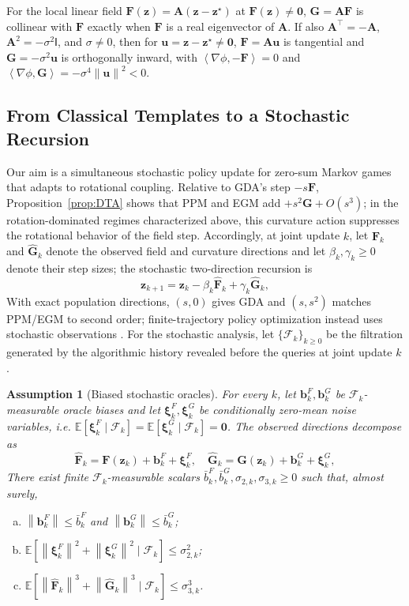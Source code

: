 \documentclass{article}
\newtheorem{assumption}{Assumption}
\theoremstyle{remark}
\newcommand{\E}{\mathbb{E}}
\newcommand{\inner}[2]{\left\langle #1,#2\right\rangle}
\newcommand{\norm}[1]{\left\lVert #1\right\rVert}
\newcommand{\Id}{\mathsf{I}}
\newcommand{\bz}{\boldsymbol{z}}
\newcommand{\bu}{\boldsymbol{u}}
\newcommand{\bzero}{\boldsymbol{0}}
\newcommand{\bA}{\boldsymbol{A}}
\newcommand{\bF}{\boldsymbol{F}}
\newcommand{\bG}{\boldsymbol{G}}
\newcommand{\hatF}{\widehat{\boldsymbol{F}}}
\newcommand{\hatG}{\widehat{\boldsymbol{G}}}
\newcommand{\biasF}{\boldsymbol{b}^{F}}
\newcommand{\biasG}{\boldsymbol{b}^{G}}
\newcommand{\noiseF}{\boldsymbol{\xi}^{F}}
\newcommand{\noiseG}{\boldsymbol{\xi}^{G}}
\begin{document}
For the local linear field $\bF(\bz)=\bA(\bz-\bz^\star)$ at $\bF(\bz)\neq\bzero$, $\bG=\bA\bF$ is collinear with $\bF$ exactly when $\bF$ is a real eigenvector of $\bA$.
If also $\bA^\top=-\bA$, $\bA^2=-\sigma^2\Id$, and $\sigma\neq0$, then for $\bu=\bz-\bz^\star\neq\bzero$, $\bF=\bA\bu$ is tangential and $\bG=-\sigma^2\bu$ is orthogonally inward, with $\inner{\nabla\phi}{-\bF}=0$ and $\inner{\nabla\phi}{\bG}=-\sigma^4\norm{\bu}^2<0$.

\subsection{From Classical Templates to a Stochastic Recursion}\label{subsec:oracle_model}
Our aim is a simultaneous stochastic policy update for zero-sum Markov games that adapts to rotational coupling.
Relative to GDA's step $-s\bF$, Proposition~\ref{prop:DTA} shows that PPM and EGM add $+s^2\bG+O(s^3)$; in the rotation-dominated regimes characterized above, this curvature action suppresses the rotational behavior of the field step.
Accordingly, at joint update $k$, let $\hatF_k$ and $\hatG_k$ denote the observed field and curvature directions and let $\beta_k,\gamma_k\ge0$ denote their step sizes; the stochastic two-direction recursion is
\begin{equation}\label{eq:update}
\bz_{k+1}
=
\bz_{k}-\beta_{k}\hatF_{k}+\gamma_{k}\hatG_{k},
\end{equation}
With exact population directions, $(s,0)$ gives GDA and $(s,s^2)$ matches PPM/EGM to second order; finite-trajectory policy optimization instead uses stochastic observations \cite{Sutton2000PolicyGradient}.
For the stochastic analysis, let $\{\mathscr F_k\}_{k\ge0}$ be the filtration generated by the algorithmic history revealed before the queries at joint update $k$.

\begin{assumption}[Biased stochastic oracles]\label{ass:oracles}
For every $k$, let $\biasF_k,\biasG_k$ be $\mathscr F_k$-measurable oracle biases and let $\noiseF_k,\noiseG_k$ be conditionally zero-mean noise variables, i.e. $\E[\noiseF_k\mid\mathscr F_k]=\E[\noiseG_k\mid\mathscr F_k]=\bzero$.
The observed directions decompose as
\[
\hatF_{k}
=
\bF(\bz_{k})+\biasF_{k}+\noiseF_{k},
\quad
\hatG_{k}
=
\bG(\bz_{k})+\biasG_{k}+\noiseG_{k},
\]
There exist finite $\mathscr{F}_{k}$-measurable scalars $\bar b^{F}_{k},\bar b^{G}_{k},\sigma_{2,k},\sigma_{3,k}\ge 0$ such that, almost surely,
\begin{enumerate}[(a)]
\item $\norm{\biasF_{k}}\le \bar b^{F}_{k}$ and $\norm{\biasG_{k}}\le \bar b^{G}_{k}$;
\item $\E[\norm{\noiseF_{k}}^{2}+\norm{\noiseG_{k}}^{2} \mid\mathscr{F}_{k}]\le \sigma_{2,k}^{2}$;
\item $\E[\norm{\hatF_{k}}^{3}+\norm{\hatG_{k}}^{3} \mid\mathscr{F}_{k}]\le \sigma_{3,k}^{3}$.
\end{enumerate}
\end{assumption}
\end{document}
